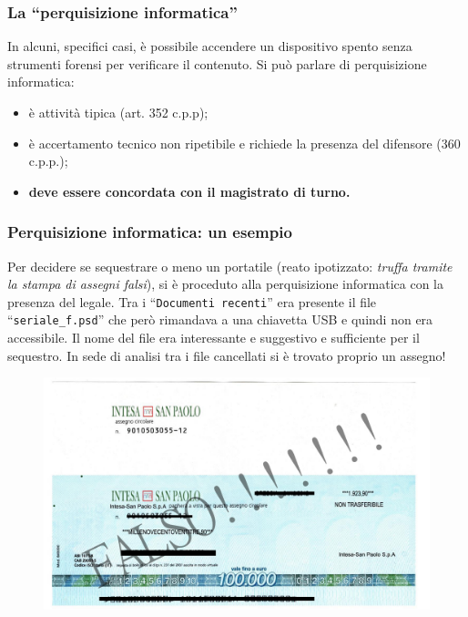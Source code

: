 \documentclass[11pt]{beamer}
\begin{document}
	\begin{frame} %
		\frametitle{La ``perquisizione informatica''}
		In alcuni, specifici casi, è possibile accendere un dispositivo spento senza strumenti forensi per verificare il contenuto. 
		\vfill
		Si può parlare di perquisizione informatica:
		\begin{itemize}
			\item è attività tipica (art. 352 c.p.p);
			\item è accertamento tecnico non ripetibile e richiede la presenza del difensore (360 c.p.p.);
			\item \textbf{deve essere concordata con il magistrato di turno.}
		\end{itemize}
	\end{frame}
	

	
	\begin{frame}[shrink]
		\frametitle{Perquisizione informatica: un esempio}
		Per decidere se sequestrare o meno un portatile (reato ipotizzato: \textit{truffa tramite la stampa di assegni falsi}), si è proceduto alla perquisizione informatica con la presenza del legale.
		\vfill
		Tra i ``\texttt{Documenti recenti}'' era presente il file ``\texttt{seriale\_f.psd}'' che però rimandava a una chiavetta USB e quindi non era accessibile.
		\vfill
		Il nome del file era interessante e suggestivo e sufficiente per il sequestro. In sede di analisi tra i file cancellati si è trovato proprio un assegno!
		\begin{figure}
			\centering
			\includegraphics[width=0.6\textheight]{pics/assegno_psd}
			\label{fig:assegno_psd}
		\end{figure}
	\end{frame}
		
\end{document}
